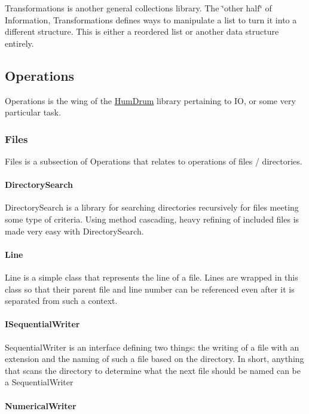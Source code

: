 Transformations is another general collections library. The \char`\"{}other half\char`\"{} of Information, Transformations defines ways to manipulate a list to turn it into a different structure. This is either a reordered list or another data structure entirely.

\subsection*{Operations}

Operations is the wing of the \hyperlink{namespaceHumDrum}{Hum\+Drum} library pertaining to IO, or some very particular task.

\subsubsection*{Files}

Files is a subsection of Operations that relates to operations of files / directories.

\paragraph*{Directory\+Search}

Directory\+Search is a library for searching directories recursively for files meeting some type of criteria. Using method cascading, heavy refining of included files is made very easy with Directory\+Search.

\paragraph*{Line}

Line is a simple class that represents the line of a file. Lines are wrapped in this class so that their parent file and line number can be referenced even after it is separated from such a context.

\paragraph*{I\+Sequential\+Writer}

Sequential\+Writer is an interface defining two things\+: the writing of a file with an extension and the naming of such a file based on the directory. In short, anything that scans the directory to determine what the next file should be named can be a Sequential\+Writer

\paragraph*{Numerical\+Writer}

